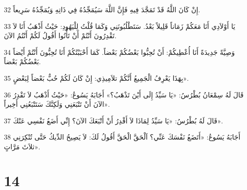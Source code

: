 \par 32 إِنْ كَانَ اللَّهُ قَدْ تَمَجَّدَ فِيهِ فَإِنَّ اللَّهَ سَيُمَجِّدُهُ فِي ذَاتِهِ وَيُمَجِّدُهُ سَرِيعاً.
\par 33 يَا أَوْلاَدِي أَنَا مَعَكُمْ زَمَاناً قَلِيلاً بَعْدُ. سَتَطْلُبُونَنِي وَكَمَا قُلْتُ لِلْيَهُودِ: حَيْثُ أَذْهَبُ أَنَا لاَ تَقْدِرُونَ أَنْتُمْ أَنْ تَأْتُوا أَقُولُ لَكُمْ أَنْتُمُ الآنَ.
\par 34 وَصِيَّةً جَدِيدَةً أَنَا أُعْطِيكُمْ: أَنْ تُحِبُّوا بَعْضُكُمْ بَعْضاً. كَمَا أَحْبَبْتُكُمْ أَنَا تُحِبُّونَ أَنْتُمْ أَيْضاً بَعْضُكُمْ بَعْضاً.
\par 35 بِهَذَا يَعْرِفُ الْجَمِيعُ أَنَّكُمْ تلاَمِيذِي: إِنْ كَانَ لَكُمْ حُبٌّ بَعْضاً لِبَعْضٍ».
\par 36 قَالَ لَهُ سِمْعَانُ بُطْرُسُ: «يَا سَيِّدُ إِلَى أَيْنَ تَذْهَبُ؟» أَجَابَهُ يَسُوعُ: «حَيْثُ أَذْهَبُ لاَ تَقْدِرُ الآنَ أَنْ تَتْبَعَنِي وَلَكِنَّكَ سَتَتْبَعُنِي أَخِيراً».
\par 37 قَالَ لَهُ بُطْرُسُ: «يَا سَيِّدُ لِمَاذَا لاَ أَقْدِرُ أَنْ أَتْبَعَكَ الآنَ؟ إِنِّي أَضَعُ نَفْسِي عَنْكَ».
\par 38 أَجَابَهُ يَسُوعُ: «أَتَضَعُ نَفْسَكَ عَنِّي؟ اَلْحَقَّ الْحَقَّ أَقُولُ لَكَ: لاَ يَصِيحُ الدِّيكُ حَتَّى تُنْكِرَنِي ثلاَثَ مَرَّاتٍ».

\chapter{14}

